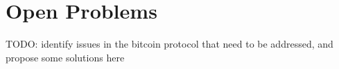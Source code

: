 \section{Open Problems}
TODO: identify issues in the bitcoin protocol that need to be addressed, and propose some solutions here